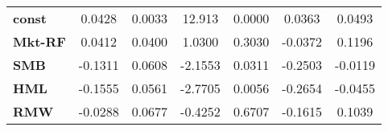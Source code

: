 \begin{center}
\begin{tabular}{lcccccc}
\midrule
\textbf{const}  &       0.0428       &       0.0033       &      12.913     &      0.0000      &       0.0363      &       0.0493       \\
\textbf{Mkt-RF} &       0.0412       &       0.0400       &      1.0300     &      0.3030      &      -0.0372      &       0.1196       \\
\textbf{SMB}    &      -0.1311       &       0.0608       &     -2.1553     &      0.0311      &      -0.2503      &      -0.0119       \\
\textbf{HML}    &      -0.1555       &       0.0561       &     -2.7705     &      0.0056      &      -0.2654      &      -0.0455       \\
\textbf{RMW}    &      -0.0288       &       0.0677       &     -0.4252     &      0.6707      &      -0.1615      &       0.1039       \\
\bottomrule
\end{tabular}
\end{center}
